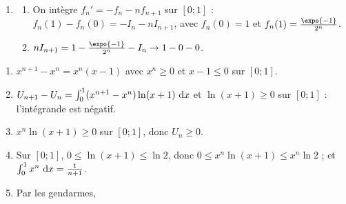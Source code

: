 \begin{description}
\begin{enumerate}
\begin{enumerate}
				Les deux bornes tendent vers $0$. \par\noindent{}
		\end{enumerate}
		\item
		\begin{enumerate}
			\item {}
				On intègre $f_n' = -f_n - nf_{n+1}$ sur $[0;1]$ : $f_n(1) - f_n(0) = -I_n - nI_{n+1}$, avec $f_n(0) = 1$ et $f_n(1) = \frac{\expo{-1}}{2^n}$.
				\par\noindent{}
			\item {}
				$nI_{n+1} = 1 - \frac{\expo{-1}}{2^n} - I_n \to 1 - 0 - 0$. \par\noindent{}
		\end{enumerate}
	\end{enumerate}
	\item[Partie C]
	\begin{enumerate}
		\item {}
			$x^{n+1} - x^n = x^n(x - 1)$ avec $x^n \geq 0$ et $x - 1 \leq 0$ sur $[0;1]$. \par\noindent{}
		\item {}
			$U_{n+1} - U_n = \int_0^1 (x^{n+1} - x^n)\ln(x+1)~\mathrm{d}x$ et $\ln(x + 1) \geq 0$ sur $[0;1]$ : l'intégrande est négatif.
			\par\noindent{}
		\item {}
			$x^n\ln(x+1) \geq 0$ sur $[0;1]$, donc $U_n \geq 0$. \par\noindent{}
		\item {}
			Sur $[0;1]$, $0 \leq \ln(x+1) \leq \ln 2$, donc $0 \leq x^n\ln(x+1) \leq x^n\ln 2$ ; et $\int_0^1 x^n~\mathrm{d}x = \frac{1}{n+1}$.
			\par\noindent{}
		\item {}
			Par les gendarmes, \par\noindent{}
	\end{enumerate}
\end{description}
